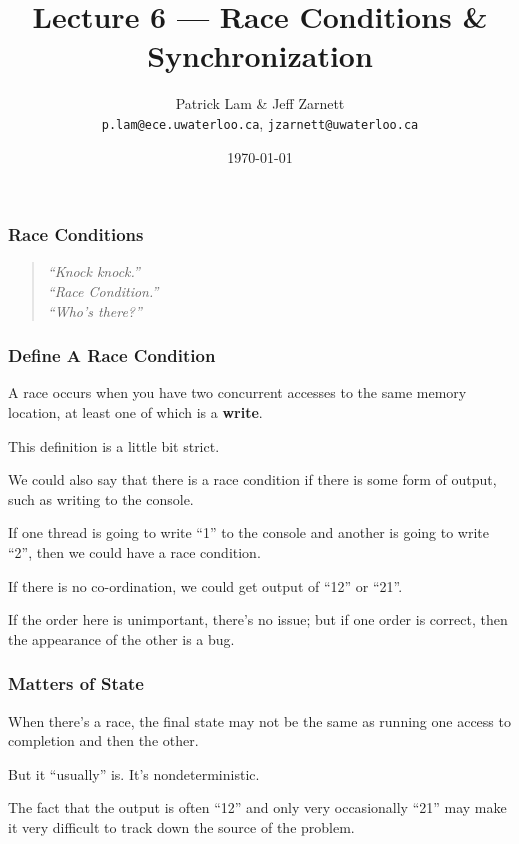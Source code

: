 
\usepackage{multirow}

\title{Lecture 6 --- Race Conditions \& Synchronization }

\author{Patrick Lam \& Jeff Zarnett \\ \small \texttt{p.lam@ece.uwaterloo.ca}, \texttt{jzarnett@uwaterloo.ca}}
\date{\today}




\begin{frame}
  \titlepage

 \end{frame}



\begin{frame}
\frametitle{Race Conditions }

\vfill
\begin{quote}
\textit{
	``Knock knock.''\\
	``Race Condition.''\\
	``Who's there?''
	}
\end{quote}
\end{frame}



\begin{frame}
\frametitle{Define A Race Condition}

A race occurs when you have two concurrent accesses to the
same memory location, at least one of which is a {\bf write}.

This definition is a little bit strict. 

We could also say that there is a race condition if there is some form of output, such as writing to the console. 

If one thread is going to write ``1'' to the console and another is going to write ``2'', then we could have a race condition. 

If there is no co-ordination, we could get output of ``12'' or ``21''. 

If the order here is unimportant, there's no issue; but if one order is correct, then the appearance of the other is a bug.

\end{frame}



\begin{frame}
\frametitle{Matters of State}

When there's a race, the final state may not be the same as running
one access to completion and then the other. 

But it ``usually'' is.  It's nondeterministic. 

The fact that the output is often ``12'' and only very occasionally ``21'' may make it very difficult to track down the source of the problem. 

\end{frame}



